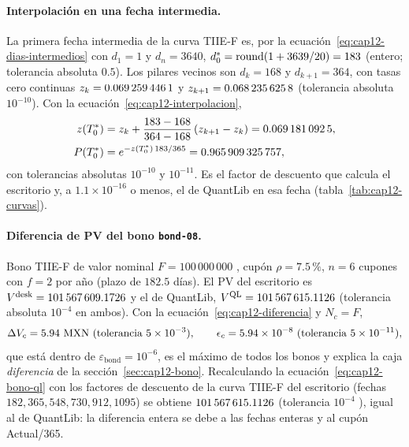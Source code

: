 \paragraph{Interpolación en una fecha intermedia.} La primera fecha intermedia de la curva TIIE-F es, por la
ecuación~\eqref{eq:cap12-dias-intermedios} con $d_1 = 1$ y $d_n = 3640$, $d^{\ast}_0 = \operatorname{round}(1 + 3639/20) =
\verif{cap12-dia-intermedio}{183}$ (entero; tolerancia absoluta $0.5$). Los pilares vecinos son $d_k = 168$ y $d_{k+1} = 364$, con
tasas cero continuas $z_k = \verif{cap12-cero-168}{0.0692594461}$ y $z_{k+1} = \verif{cap12-cero-364}{0.0682356258}$
(tolerancia absoluta $10^{-10}$). Con la ecuación~\eqref{eq:cap12-interpolacion},
\begin{align*}
  z(T^{\ast}_0) &= z_k + \frac{183 - 168}{364 - 168}\,(z_{k+1} - z_k) = \verif{cap12-cero-intermedio}{0.0691810925},\\
  P(T^{\ast}_0) &= e^{-z(T^{\ast}_0)\,183/365} = \verif{cap12-df-intermedio}{0.965909325757},
\end{align*}
con tolerancias absolutas $10^{-10}$ y $10^{-11}$. Es el factor de descuento que calcula el escritorio y, a
$1.1\times 10^{-16}$ o menos, el de QuantLib en esa fecha (tabla~\ref{tab:cap12-curvas}).

\paragraph{Diferencia de PV del bono \texttt{bond-08}.} Bono TIIE-F de valor nominal $F = 100\,000\,000$ \MXN, cupón
$\rho = 7.5\,\%$, $n = 6$ cupones con $f = 2$ por año (plazo de $182.5$ días). El PV del escritorio es
$V^{\mathrm{desk}} = \verif{cap12-pv-bond08}{101567609.1726}$ \MXN y el de QuantLib,
$V^{\mathrm{QL}} = \verif{cap12-pv-ref-bond08}{101567615.1126}$ \MXN (tolerancia absoluta $10^{-4}$ \MXN en ambos). Con la
ecuación~\eqref{eq:cap12-diferencia} y $N_c = F$,
\[
  \Delta V_c = \verif{cap12-dif-abs-bond08}{5.94}\ \MXN \ (\text{tolerancia } 5\times 10^{-3}),
  \qquad
  \epsilon_c = \verif{cap12-dif-rel-bond08}{5.94e-8} \ (\text{tolerancia } 5\times 10^{-11}),
\]
que está dentro de $\varepsilon_{\mathrm{bond}} = 10^{-6}$, es el máximo de todos los bonos y explica la caja
\emph{diferencia} de la sección~\ref{sec:cap12-bono}. Recalculando la ecuación~\eqref{eq:cap12-bono-ql} con los factores de descuento de la curva
TIIE-F del escritorio (fechas $182, 365, 548, 730, 912, 1095$) se obtiene
$\verif{cap12-pv-bond08-fechas-enteras}{101567615.1126}$ \MXN (tolerancia $10^{-4}$ \MXN), igual al de QuantLib: la
diferencia entera se debe a las fechas enteras y al cupón Actual/365.

